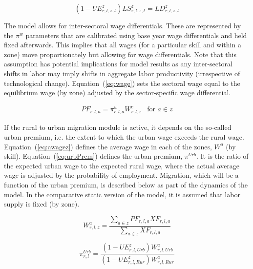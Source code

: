 \documentclass[11pt,letterpaper]{report}
\begin{document}
\begin{equation}
\label{eq:uez}
\left( 1 - \mathit{UE}^z_{r,l,z,t} \right) \mathit{LS}^z_{r,l,z,t}
   = \mathit{LD}^z_{r,l,z,t}
\end{equation}

The model allows for inter-sectoral wage differentials. These are represented by
the $\pi^w$ parameters that are calibrated using base year wage differentials
and held fixed afterwards. This implies that all wages (for a particular skill
and within a zone) move proportionately but allowing for wage differentials.
Note that this assumption has potential implications for model results as any
inter-sectoral shifts in labor may imply shifts in aggregate labor productivity
(irrespective of technological change). Equation~(\ref{eq:wage}) sets the
sectoral wage equal to the equilibrium wage (by zone) adjusted by the
sector-specific wage differential.

\begin{equation}
\label{eq:wage}
\begin{array}{*{20}{l}}
\mathit{PF}_{r,l,a} = \pi^w_{r,l,a} W^e_{r,l,z} & \textrm{for } a \in z
\end{array}
\end{equation}

If the rural to urban migration module is active, it depends on the so-called
urban premium, i.e. the extent to which the urban wage exceeds the rural wage.
Equation~(\ref{eq:awagez}) defines the average wage in each of the zones, $W^a$
(by skill). Equation~(\ref{eq:urbPrem}) defines the urban premium,
$\pi^{\mathit{Urb}}$. It is the ratio of the expected urban wage to the expected
rural wage, where the actual average wage is adjusted by the probability of
employment. Migration, which will be a function of the urban premium, is
described below as part of the dynamics of the model. In the comparative static
version of the model, it is assumed that labor supply is fixed (by zone).

\begin{equation}
\label{eq:awagez}
\mathit{W}^a_{r,l,z} =
   \frac{ \sum_{a \in z} {\mathit{PF}_{r,l,a} \mathit{XF}_{r,l,a} } }
        { \sum_{a \in z} {\mathit{XF}_{r,l,a} } }
\end{equation}

\begin{equation}
\label{eq:urbPrem}
\pi^{\mathit{Urb}}_{r,l} =
   \frac { \left( 1 - \mathit{UE}^z_{r,l,\mathit{Urb}} \right)
            W^a_{r,l,\mathit{Urb}}}
         {\left( 1 - \mathit{UE}^z_{r,l,\mathit{Rur}}\right)
            W^a_{r,l,\mathit{Rur}}}
\end{equation}
\end{document}
